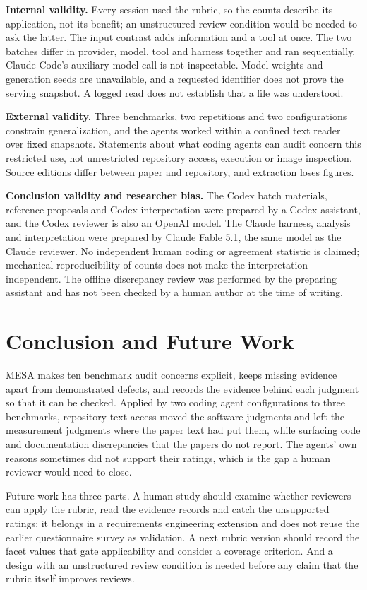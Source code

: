 \documentclass[10pt,conference]{IEEEtran}
\begin{document}
\textbf{Internal validity.} Every session used the rubric, so the counts describe its application, not its benefit; an unstructured review condition would be needed to ask the latter. The input contrast adds information and a tool at once. The two batches differ in provider, model, tool and harness together and ran sequentially. Claude Code's auxiliary model call is not inspectable. Model weights and generation seeds are unavailable, and a requested identifier does not prove the serving snapshot. A logged read does not establish that a file was understood.

\textbf{External validity.} Three benchmarks, two repetitions and two configurations constrain generalization, and the agents worked within a confined text reader over fixed snapshots. Statements about what coding agents can audit concern this restricted use, not unrestricted repository access, execution or image inspection. Source editions differ between paper and repository, and extraction loses figures.

\textbf{Conclusion validity and researcher bias.} The Codex batch materials, reference proposals and Codex interpretation were prepared by a Codex assistant, and the Codex reviewer is also an OpenAI model. The Claude harness, analysis and interpretation were prepared by Claude Fable 5.1, the same model as the Claude reviewer. No independent human coding or agreement statistic is claimed; mechanical reproducibility of counts does not make the interpretation independent. The offline discrepancy review was performed by the preparing assistant and has not been checked by a human author at the time of writing.

\section{Conclusion and Future Work}
MESA makes ten benchmark audit concerns explicit, keeps missing evidence apart from demonstrated defects, and records the evidence behind each judgment so that it can be checked. Applied by two coding agent configurations to three benchmarks, repository text access moved the software judgments and left the measurement judgments where the paper text had put them, while surfacing code and documentation discrepancies that the papers do not report. The agents' own reasons sometimes did not support their ratings, which is the gap a human reviewer would need to close.

Future work has three parts. A human study should examine whether reviewers can apply the rubric, read the evidence records and catch the unsupported ratings; it belongs in a requirements engineering extension and does not reuse the earlier questionnaire survey as validation. A next rubric version should record the facet values that gate applicability and consider a coverage criterion. And a design with an unstructured review condition is needed before any claim that the rubric itself improves reviews.
\end{document}
